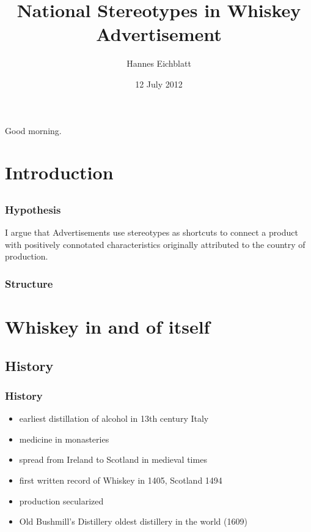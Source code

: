 \documentclass{beamer}
\title{National Stereotypes in Whiskey Advertisement}
\institute{Institut für Anglistik\\Universität Leipzig}
\author{Hannes Eichblatt}
\date{12 July 2012}
\begin{document}
{ %
        \begin{frame}[t]{Good morning.}
        \end{frame}
    }



\frame[plain]{\maketitle}

\section{Introduction}
\subsection{}

\begin{frame}
 \frametitle{Hypothesis}
 \begin{block}{I argue that}
  Advertisements use stereotypes as shortcuts to connect a product with positively connotated characteristics originally attributed to the country of production.
 \end{block}
\end{frame}

\begin{frame}
 \frametitle{Structure}
 \tableofcontents
\end{frame}

\section{Whiskey in and of itself}
\subsection{History}

\begin{frame}
 \frametitle{History}
 \begin{itemize}
  \item earliest distillation of alcohol in 13th century Italy
  \item medicine in monasteries
  \item spread from Ireland to Scotland in medieval times
  \item first written record of Whiskey in 1405, Scotland 1494
  \item production secularized
  \item Old Bushmill's Distillery oldest distillery in the world (1609)
 \end{itemize}
\end{frame}
\end{document}
